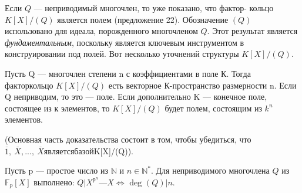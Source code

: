 \documentclass{mai_book}
\begin{document}
Если $Q$ — неприводимый многочлен, то уже показано, что фактор- 
кольцо $K[X]\slash(Q)$ является полем (предложение 22). Обозначение $(Q)$  
использовано для идеала, порожденного многочленом $Q$. Этот результат 
является \textit{фундаментальным}, поскольку является ключевым  
инструментом в конструировании под полей. Вот несколько уточнений структуры 
$K[X]\slash(Q)$. 

\begin{predl}
\hspace*{0.5cm}Пусть Q — многочлен степени n с коэффициентами в поле К. Тогда 
факторкольцо $K[X]\slash(Q)$ есть векторное К-пространство размерности 
n. Если Q неприводим, то это — поле. Если дополнительно K —  
конечное поле, состоящее из к элементов, то $K[X]\slash(Q)$ будет полем,  
состоящим из $k^n$ элементов.
\end{predl}

(Основная часть доказательства состоит в том, чтобы убедиться, 
что $\overline{1},\: \overline{X},...,\: \overline{X} является базой $K[X]\slash(Q)).

\begin{thm}
\hspace*{0.5cm}Пусть p — простое число из $\mathbb{N}$ и $ n \in \mathbb{N}^*$. Для неприводимого 
многочлена $Q$ из $\mathbb{F}_p[X]$ выполнено: $Q | X^{р^n} — X \Leftrightarrow$ $\text{deg}$ $(Q) | n$.
\end{thm} 
\newpage
\end{document}
